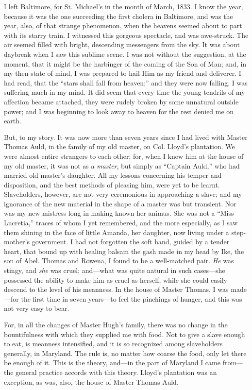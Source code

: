 I left Baltimore, for St. Michael's in the month of March, 1833. I know
the year, because it was the one succeeding the first cholera in
Baltimore, and was the year, also, of that strange phenomenon, when the
heavens seemed about to part with its starry train. I witnessed this
gorgeous spectacle, and was awe-struck. The air seemed filled with
bright, descending messengers from the sky. It was about daybreak when I
saw this sublime scene. I was not without the suggestion, at the moment,
that it might be the harbinger of the coming of the Son of Man; and, in
my then state of mind, I was prepared to hail Him as my friend and
deliverer. I had read, that the ``stars shall fall from heaven;'' and
they were now falling. I was suffering much in my mind. It did seem that
every time the young tendrils of my affection became attached, they were
{\protect\hypertarget{187}{}{}}rudely broken by some unnatural outside
power; and I was beginning to look away to heaven for the rest denied me
on earth.

But, to my story. It was now more than seven years since I had lived
with Master Thomas Auld, in the family of my old master, on Col. Lloyd's
plantation. We were almost entire strangers to each other; for, when I
knew him at the house of my old master, it was not as a \emph{master},
but simply as ``Captain Auld,'' who had married old master's daughter.
All my lessons concerning his temper and disposition, and the best
methods of pleasing him, were yet to be learnt. Slaveholders, however,
are not very ceremonious in approaching a slave; and my ignorance of the
new material in the shape of a master was but transient. Nor was my new
mistress long in making known her animus. She was not a ``Miss
Lucretia,'' traces of whom I yet remembered, and the more especially, as
I saw them shining in the face of little Amanda, her daughter, now
living under a step-mother's government. I had not forgotten the soft
hand, guided by a tender heart, that bound up with healing balsam the
gash made in my head by Ike, the son of Abel. Thomas and Rowena, I found
to be a well-matched pair. \emph{He} was stingy, and \emph{she} was
cruel; and---what was quite natural in such cases---she possessed the
ability to make him as cruel as herself, while she could easily descend
to the level of his meanness. In the house of Master Thomas, I was
made---for the first time in seven years---to feel the pinchings of
hunger, and this was not very easy to bear.

For, in all the changes of Master Hugh's family,
{\protect\hypertarget{188}{}{}}there was no change in the bountifulness
with which they supplied me with food. Not to give a slave enough to
eat, is meanness intensified, and it is so recognized among slaveholders
generally, in Maryland. The rule is, no matter how coarse the food, only
let there be enough of it. This is the theory, and---in the part of
Maryland I came from---the general practice accords with this theory.
Lloyd's plantation was an exception, as was, also, the house of Master
Thomas Auld.

